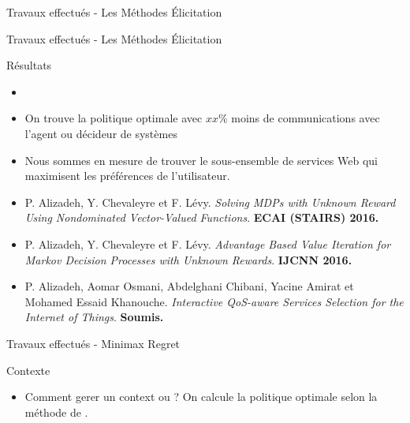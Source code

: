 \documentclass{beamer}
\newcommand{\imp}[1]{{\color{red}{#1}}}
\begin{document}
{{\begin{frame}{Travaux effectués - Les Méthodes Élicitation}
\end{frame}


\begin{frame}{Travaux effectués - Les Méthodes Élicitation}

\begin{block}{Résultats}
\begin{itemize}
\item
\item On trouve la politique optimale avec $xx \% $  moins de communications avec l’agent ou décideur de
systèmes
\item Nous sommes en mesure de trouver le sous-ensemble de services Web qui maximisent les préférences de l'utilisateur.
\end{itemize}
\end{block}

\begin{itemize}
\small
\item P. Alizadeh, Y. Chevaleyre et F. Lévy. \textit{Solving MDPs with Unknown Reward Using Nondominated Vector-Valued Functions}. \textbf{ECAI (STAIRS) 2016.}
\item P. Alizadeh, Y. Chevaleyre et F. Lévy. \textit{Advantage Based Value Iteration for Markov Decision Processes with Unknown Rewards}. \textbf{IJCNN 2016.}
\item P. Alizadeh, Aomar Osmani, Abdelghani Chibani, Yacine Amirat et Mohamed Essaid Khanouche. \textit{Interactive QoS-aware Services Selection for the Internet of Things}. \textbf{Soumis.}
\end{itemize}


\end{frame}



\begin{frame}{Travaux effectués - Minimax Regret }

\begin{block}{Contexte}
\begin{itemize}
\item Comment gerer un context ou \imp{les récompenses sont incertaines}? On calcule la politique optimale selon la méthode de \imp{minimax regret}.
\end{itemize}
\end{block}



\end{frame}}}
\end{document}
